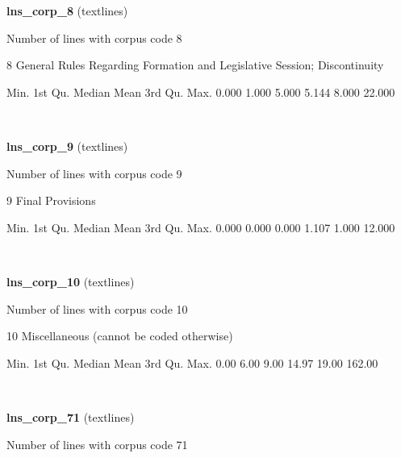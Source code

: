\documentclass[]{article}
\newenvironment{Shaded}{\begin{snugshade}}{\end{snugshade}}
\newcommand{\FloatTok}[1]{\textcolor[rgb]{0.00,0.00,0.81}{{#1}}}
\newcommand{\NormalTok}[1]{{#1}}
\begin{document}
\textbf{lns\_corp\_8} (textlines)

Number of lines with corpus code 8

8 General Rules Regarding Formation and Legislative Session;
Discontinuity

\begin{Shaded}
\begin{Highlighting}[]
   \NormalTok{Min. 1st Qu.  Median    Mean 3rd Qu.    Max. }
  \FloatTok{0.000}   \FloatTok{1.000}   \FloatTok{5.000}   \FloatTok{5.144}   \FloatTok{8.000}  \FloatTok{22.000} 
\end{Highlighting}
\end{Shaded}

~

\vspace{1em}

\textbf{lns\_corp\_9} (textlines)

Number of lines with corpus code 9

9 Final Provisions

\begin{Shaded}
\begin{Highlighting}[]
   \NormalTok{Min. 1st Qu.  Median    Mean 3rd Qu.    Max. }
  \FloatTok{0.000}   \FloatTok{0.000}   \FloatTok{0.000}   \FloatTok{1.107}   \FloatTok{1.000}  \FloatTok{12.000} 
\end{Highlighting}
\end{Shaded}

~

\vspace{1em}

\textbf{lns\_corp\_10} (textlines)

Number of lines with corpus code 10

10 Miscellaneous (cannot be coded otherwise)

\begin{Shaded}
\begin{Highlighting}[]
   \NormalTok{Min. 1st Qu.  Median    Mean 3rd Qu.    Max. }
   \FloatTok{0.00}    \FloatTok{6.00}    \FloatTok{9.00}   \FloatTok{14.97}   \FloatTok{19.00}  \FloatTok{162.00} 
\end{Highlighting}
\end{Shaded}

~

\vspace{1em}

\textbf{lns\_corp\_71} (textlines)

Number of lines with corpus code 71
\end{document}
